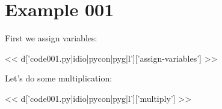 \section{Example 001}

First we assign variables:

<< d['code001.py|idio|pycon|pyg|l']['assign-variables'] >>

Let's do some multiplication:

<< d['code001.py|idio|pycon|pyg|l']['multiply'] >>

